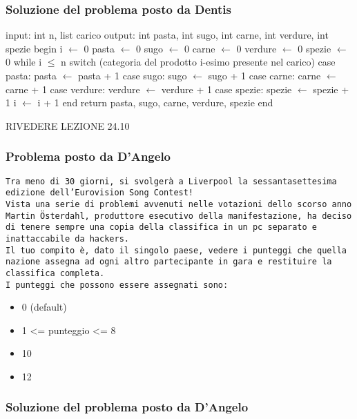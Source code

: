 \documentclass[a4paper]{article}
\begin{document}
\subsubsection{Soluzione del problema posto da Dentis}
\begin{algorithm}[caption={La cucina di Chef Tony (pt.1)}, label={alg1}]
 input: int n, list carico
 output: int pasta, int sugo, int carne, int verdure, int spezie
 begin
   i $\gets$ 0
   pasta $\gets$ 0
   sugo $\gets$ 0
   carne $\gets$ 0
   verdure $\gets$ 0
   spezie $\gets$ 0
   while i $\leq$ n 
      switch (categoria del prodotto i-esimo presente nel carico)
        case pasta:
            pasta $\gets$ pasta + 1
        case sugo:
            sugo $\gets$ sugo + 1
        case carne:
            carne $\gets$ carne + 1
        case verdure:
            verdure $\gets$ verdure + 1
        case spezie:
            spezie $\gets$ spezie + 1
      i $\gets$ i + 1
   end
   return pasta, sugo, carne, verdure, spezie
 end       
\end{algorithm}
RIVEDERE LEZIONE 24.10

\subsubsection{Problema posto da D'Angelo}
\texttt{Tra meno di 30 giorni, si svolgerà a Liverpool la sessantasettesima edizione dell’Eurovision Song Contest!\\Vista una serie di problemi avvenuti nelle votazioni dello scorso anno Martin Österdahl, produttore esecutivo della manifestazione, ha deciso di tenere sempre una copia della classifica in un pc separato e inattaccabile da hackers.\\Il tuo compito è, dato il singolo paese, vedere i punteggi che quella nazione assegna ad ogni altro partecipante in gara e restituire la classifica completa.\\I punteggi che possono essere assegnati sono:}
\begin{itemize}
\item 0 (default)
\item 1 <= punteggio <= 8
\item 10
\item 12
\end{itemize}

\subsubsection{Soluzione del problema posto da D'Angelo}
\end{document}

